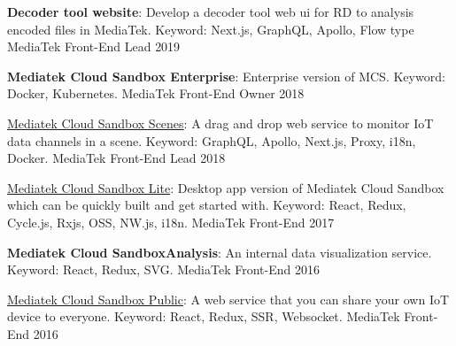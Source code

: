 \begin{cvhonors}
  \cvhonor
    {\textbf{Decoder tool website}: \textmd{Develop a decoder tool web ui for RD to analysis encoded files in MediaTek. Keyword: Next.js, GraphQL, Apollo, Flow type}} %
    {MediaTek} %
    {Front-End Lead} %
    {2019} %

  \cvhonor
    {\textbf{Mediatek Cloud Sandbox Enterprise}: \textmd{Enterprise version of MCS. Keyword: Docker, Kubernetes.}} %
    {MediaTek} %
    {Front-End Owner} %
    {2018} %

  \cvhonor
    {\href{https://medium.com/mediatekcloudsandbox/\%E5\%A6\%82\%E4\%BD\%95\%E9\%80\%8F\%E9\%81\%8E-scene-\%E5\%A0\%B4\%E6\%99\%AF-\%E5\%8A\%9F\%E8\%83\%BD\%E5\%BF\%AB\%E9\%80\%9F\%E6\%89\%93\%E9\%80\%A0\%E7\%89\%A9\%E8\%81\%AF\%E7\%B6\%B2\%E6\%87\%89\%E7\%94\%A8-1-d10d0d687742}{Mediatek Cloud Sandbox Scenes}: \textmd{A drag and drop web service to monitor IoT data channels in a scene. Keyword: GraphQL, Apollo, Next.js, Proxy, i18n, Docker.}} %
    {MediaTek} %
    {Front-End Lead} %
    {2018} %

  \cvhonor
    {\href{https://mcslite.netlify.com/}{Mediatek Cloud Sandbox Lite}: \textmd{Desktop app version of Mediatek Cloud Sandbox which can be quickly built and get started with. Keyword: React, Redux, Cycle.js, Rxjs, OSS, NW.js, i18n.}} %
    {MediaTek} %
    {Front-End} %
    {2017} %

  \cvhonor
    {\textbf{Mediatek Cloud SandboxAnalysis}: \textmd{An internal data visualization service. Keyword: React, Redux, SVG.}} %
    {MediaTek} %
    {Front-End} %
    {2016} %

  \cvhonor
    {\href{https://medium.com/mediatekcloudsandbox/\%E5\%B0\%87\%E6\%82\%A8\%E7\%9A\%84\%E8\%A3\%9D\%E7\%BD\%AE\%E8\%A8\%AD\%E7\%82\%BA\%E5\%85\%AC\%E9\%96\%8B\%E4\%B8\%A6\%E5\%88\%86\%E4\%BA\%AB\%E7\%B5\%A6\%E4\%BB\%BB\%E4\%BD\%95\%E4\%BA\%BA\%E7\%80\%8F\%E8\%A6\%BD-a96d47ba5859}{Mediatek Cloud Sandbox Public}: \textmd{A web service that you can share your own IoT device to everyone. Keyword: React, Redux, SSR, Websocket.}} %
    {MediaTek} %
    {Front-End} %
    {2016} %


\end{cvhonors}
